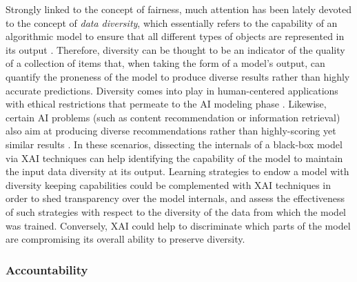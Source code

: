\documentclass[final]{elsarticle}
\begin{document}
{\color{black}Strongly linked to the concept of fairness, much attention has been lately devoted to the concept of \emph{data diversity}, which essentially refers to the capability of an algorithmic model to ensure that all different types of objects are represented in its output \cite{drosou2017diversity}. Therefore, diversity can be thought to be an indicator of the quality of a collection of items that, when taking the form of a model's output, can quantify the proneness of the model to produce diverse results rather than highly accurate predictions. Diversity comes into play in human-centered applications with ethical restrictions that permeate to the AI modeling phase \cite{lerman2013big}. Likewise, certain AI problems (such as content recommendation or information retrieval) also aim at producing diverse recommendations rather than highly-scoring yet similar results \cite{agrawal2009diversifying,smyth2001similarity}. In these scenarios, dissecting the internals of a black-box model via XAI techniques can help identifying the capability of the model to maintain the input data diversity at its output. Learning strategies to endow a model with diversity keeping capabilities could be complemented with XAI techniques in order to shed transparency over the model internals, and assess the effectiveness of such strategies with respect to the diversity of the data from which the model was trained. Conversely, XAI could help to discriminate which parts of the model are compromising its overall ability to preserve diversity.}

\subsubsection{Accountability}
\end{document}
